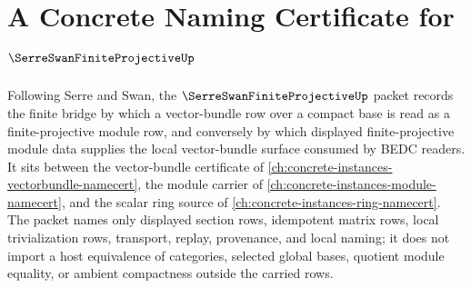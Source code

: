 \chapter{A Concrete Naming Certificate for $\SerreSwanFiniteProjectiveUp$}
\label{ch:concrete-instances-serre-swan-finite-projective-namecert}

Following Serre and Swan, the $\SerreSwanFiniteProjectiveUp$ packet records the finite bridge by which a vector-bundle row over a compact base is read as a finite-projective module row, and conversely by which displayed finite-projective module data supplies the local vector-bundle surface consumed by BEDC readers. It sits between the vector-bundle certificate of \autoref{ch:concrete-instances-vectorbundle-namecert}, the module carrier of \autoref{ch:concrete-instances-module-namecert}, and the scalar ring source of \autoref{ch:concrete-instances-ring-namecert}. The packet names only displayed section rows, idempotent matrix rows, local trivialization rows, transport, replay, provenance, and local naming; it does not import a host equivalence of categories, selected global bases, quotient module equality, or ambient compactness outside the carried rows.


